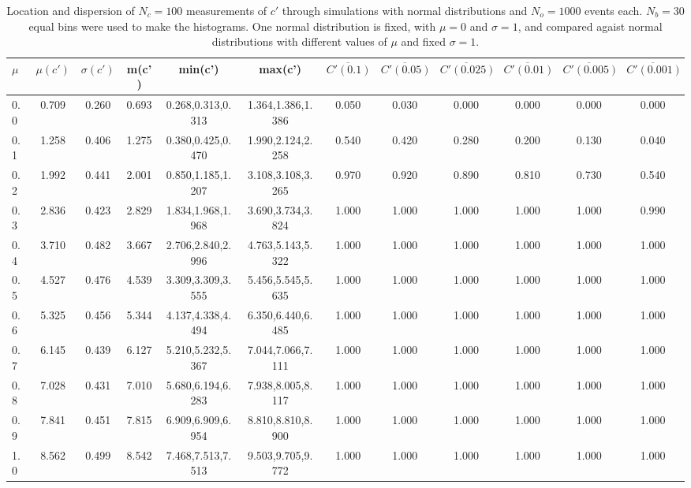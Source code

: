 \begin{table*}[h!]
\begin{center}
\begin{tabular}{| l | c | c | c | c | c | c | c | c | c | c | c |}\hline
$\mu$ & $\mu(c')$ & $\sigma(c')$ & m(c') & min(c') & max(c') & $\overline{C'(0.1)}$ & $\overline{C'(0.05)}$ & $\overline{C'(0.025)}$ & $\overline{C'(0.01)}$ & $\overline{C'(0.005)}$ & $\overline{C'(0.001)}$ \\\hline
0.0 & 0.709 & 0.260 & 0.693 & 0.268,0.313,0.313 & 1.364,1.386,1.386  & 0.050  & 0.030  & 0.000  & 0.000  & 0.000  & 0.000 \\\hline
0.1 & 1.258 & 0.406 & 1.275 & 0.380,0.425,0.470 & 1.990,2.124,2.258  & 0.540  & 0.420  & 0.280  & 0.200  & 0.130  & 0.040 \\\hline
0.2 & 1.992 & 0.441 & 2.001 & 0.850,1.185,1.207 & 3.108,3.108,3.265  & 0.970  & 0.920  & 0.890  & 0.810  & 0.730  & 0.540 \\\hline
0.3 & 2.836 & 0.423 & 2.829 & 1.834,1.968,1.968 & 3.690,3.734,3.824  & 1.000  & 1.000  & 1.000  & 1.000  & 1.000  & 0.990 \\\hline
0.4 & 3.710 & 0.482 & 3.667 & 2.706,2.840,2.996 & 4.763,5.143,5.322  & 1.000  & 1.000  & 1.000  & 1.000  & 1.000  & 1.000 \\\hline
0.5 & 4.527 & 0.476 & 4.539 & 3.309,3.309,3.555 & 5.456,5.545,5.635  & 1.000  & 1.000  & 1.000  & 1.000  & 1.000  & 1.000 \\\hline
0.6 & 5.325 & 0.456 & 5.344 & 4.137,4.338,4.494 & 6.350,6.440,6.485  & 1.000  & 1.000  & 1.000  & 1.000  & 1.000  & 1.000 \\\hline
0.7 & 6.145 & 0.439 & 6.127 & 5.210,5.232,5.367 & 7.044,7.066,7.111  & 1.000  & 1.000  & 1.000  & 1.000  & 1.000  & 1.000 \\\hline
0.8 & 7.028 & 0.431 & 7.010 & 5.680,6.194,6.283 & 7.938,8.005,8.117  & 1.000  & 1.000  & 1.000  & 1.000  & 1.000  & 1.000 \\\hline
0.9 & 7.841 & 0.451 & 7.815 & 6.909,6.909,6.954 & 8.810,8.810,8.900  & 1.000  & 1.000  & 1.000  & 1.000  & 1.000  & 1.000 \\\hline
1.0 & 8.562 & 0.499 & 8.542 & 7.468,7.513,7.513 & 9.503,9.705,9.772  & 1.000  & 1.000  & 1.000  & 1.000  & 1.000  & 1.000 \\\hline
\end{tabular}
\caption{Location and dispersion of $N_c=100$
measurements of $c'$ through simulations
with normal distributions and $N_o=1000$ events each.
$N_b=30$ equal bins were used to make the histograms.
One normal distribution is fixed, with $\mu=0$ and $\sigma=1$,
and compared agaist normal distributions with different values of $\mu$ and fixed $\sigma=1$.}
\end{center}
\end{table*}